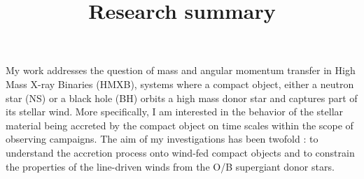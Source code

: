 \documentclass[letterpaper,12pt,onecolumn]{article}
\title{	
\vspace*{-2.5cm}
\Large Research summary \\ %
}
\author{\tiny} %
\date{\tiny }%
\makeatletter
\newcommand*{\hmxb}{HMXB\@\xspace}
\newcommand*{\ns}{NS\@\xspace}
\newcommand*{\bh}{BH\@\xspace}
\makeatother
\begin{document}


\maketitle
\thispagestyle{empty}

\vspace*{-1cm}



%

My work addresses the question of mass and angular momentum transfer in High Mass X-ray Binaries (\hmxb), systems where a compact object, either a neutron star (\ns) or a black hole (\bh) orbits a high mass donor star and captures part of its stellar wind. More specifically, I am interested in the behavior of the stellar material being accreted by the compact object on time scales within the scope of observing campaigns. The aim of my investigations has been twofold : to understand the accretion process onto wind-fed compact objects and to constrain the properties of the line-driven winds from the O/B supergiant donor stars.
\end{document}
